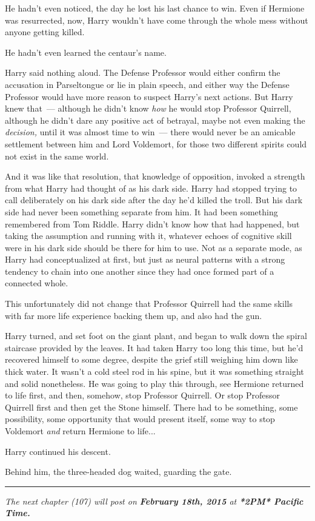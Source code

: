 He hadn't even noticed, the day he lost his last chance to win. Even if Hermione was resurrected, now, Harry wouldn't have come through the whole mess without anyone getting killed.

He hadn't even learned the centaur's name.

Harry said nothing aloud. The Defense Professor would either confirm the accusation in Parseltongue or lie in plain speech, and either way the Defense Professor would have more reason to suspect Harry's next actions. But Harry knew that~--- although he didn't know \emph{how} he would stop Professor Quirrell, although he didn't dare any positive act of betrayal, maybe not even making the \emph{decision,} until it was almost time to win~--- there would never be an amicable settlement between him and Lord Voldemort, for those two different spirits could not exist in the same world.

And it was like that resolution, that knowledge of opposition, invoked a strength from what Harry had thought of as his dark side. Harry had stopped trying to call deliberately on his dark side after the day he'd killed the troll. But his dark side had never been something separate from him. It had been something remembered from Tom Riddle. Harry didn't know how that had happened, but taking the assumption and running with it, whatever echoes of cognitive skill were in his dark side should be there for him to use. Not as a separate mode, as Harry had conceptualized at first, but just as neural patterns with a strong tendency to chain into one another since they had once formed part of a connected whole.

This unfortunately did not change that Professor Quirrell had the same skills with far more life experience backing them up, and also had the gun.

Harry turned, and set foot on the giant plant, and began to walk down the spiral staircase provided by the leaves. It had taken Harry too long this time, but he'd recovered himself to some degree, despite the grief still weighing him down like thick water. It wasn't a cold steel rod in his spine, but it was something straight and solid nonetheless. He was going to play this through, see Hermione returned to life first, and then, somehow, stop Professor Quirrell. Or stop Professor Quirrell first and then get the Stone himself. There had to be something, some possibility, some opportunity that would present itself, some way to stop Voldemort \emph{and} return Hermione to life...

Harry continued his descent.

Behind him, the three-headed dog waited, guarding the gate.

\begin{center}\rule{3in}{0.4pt}\end{center}

\emph{The next chapter (107) will post on \textbf{February 18th, 2015} at \textbf{*2PM* Pacific Time.}}
